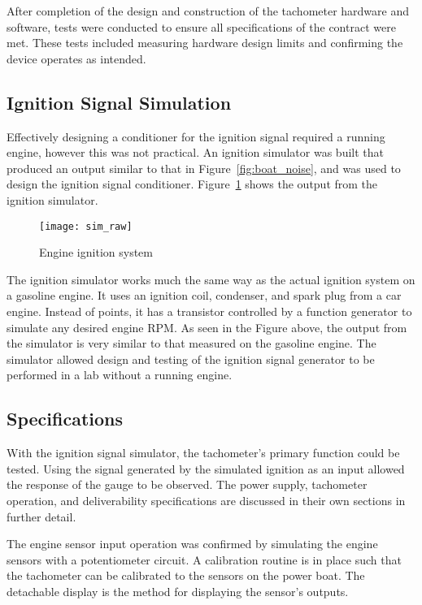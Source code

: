 After completion of the design and construction of the tachometer hardware and software, tests were conducted to ensure all specifications of the contract were met. These tests included measuring hardware design limits and confirming the device operates as intended.


\subsection{Ignition Signal Simulation}
Effectively designing a conditioner for the ignition signal required a running engine, however this was not practical. An ignition simulator was built that produced an output similar to that in Figure~\ref{fig:boat_noise}, and was used to design the ignition signal conditioner. Figure~\ref{fig:sim_raw} shows the output from the ignition simulator.

\begin{figure}[H]
    \centering
    \texttt{[image: sim\_raw]}
    \caption{Engine ignition system}
    \label{fig:sim_raw}
\end{figure}

The ignition simulator works much the same way as the actual ignition system on a gasoline engine. It uses an ignition coil, condenser, and spark plug from a car engine. Instead of points, it has a transistor controlled by a function generator to simulate any desired engine RPM. As seen in the Figure above, the output from the simulator is very similar to that measured on the gasoline engine. The simulator allowed design and testing of the ignition signal generator to be performed in a lab without a running engine.


\subsection{Specifications}
With the ignition signal simulator, the tachometer's primary function could be tested. Using the signal generated by the simulated ignition as an input allowed the response of the gauge to be observed. The power supply, tachometer operation, and deliverability specifications are discussed in their own sections in further detail.

The engine sensor input operation was confirmed by simulating the engine sensors with a potentiometer circuit. A calibration routine is in place such that the tachometer can be calibrated to the sensors on the power boat. The detachable display is the method for displaying the sensor's outputs.

